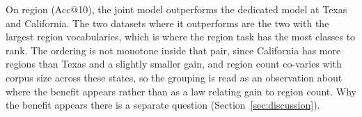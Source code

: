 On region (Acc@10), the joint model outperforms the dedicated model at Texas and California. The two
datasets where it outperforms are the two with the largest region vocabularies, which is where the
region task has the most classes to rank.
The ordering is not monotone inside that pair, since California has more regions than Texas and a
slightly smaller gain, and region count co-varies with corpus size across these states, so the
grouping is read as an observation about where the benefit appears rather than as a law relating
gain to region count. Why the benefit appears there is a separate question (Section~\ref{sec:discussion}).

